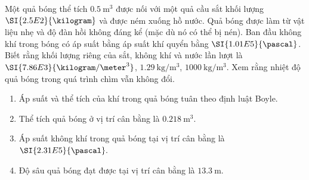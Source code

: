 \begin{ex}
	Một quả bóng thể tích $\SI{0.5}{\meter^3}$ được nối với một quả cầu sắt khối lượng $\SI{2.5E2}{\kilogram}$ và được ném xuống hồ nước. Quả bóng được làm từ vật liệu nhẹ và độ đàn hồi không đáng kể (mặc dù nó có thể bị nén). Ban đầu không khí trong bóng có áp suất bằng áp suất khí quyển bằng $\SI{1.01E5}{\pascal}$. Biết rằng khối lượng riêng của sắt, không khí và nước lần lượt  là $\SI{7.86E3}{\kilogram/\meter^3}$, $\SI{1.29}{\kilogram/\meter^3}$, $\SI{1000}{\kilogram/\meter^3}$. Xem rằng nhiệt độ quả bóng trong quá trình chìm vẫn không đổi.
	\begin{enumerate}[label=\alph*)]
		\item Áp suất và thể tích của khí trong quả bóng tuân theo định luật Boyle.
		\item Thể tích quả bóng ở vị trí cân bằng là $\SI{0.218}{\meter^3}$.
		\item Áp suất không khí trong quả bóng tại vị trí cân bằng là $\SI{2.31E5}{\pascal}.$
		\item Độ sâu quả bóng đạt được tại vị trí cân bằng là $\SI{13.3}{\meter}$.
	\end{enumerate}
	
\end{ex}
